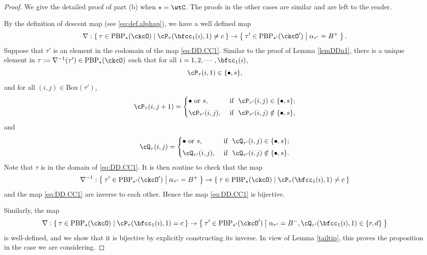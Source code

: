 \documentclass[12pt,a4paper]{amsart}
\def\DD{\nabla}
\numberwithin{equation}{section}
\theoremstyle{remark}
\def\ckcOp{\ckcO^{\prime}}
\def\BOX{\mathrm{Box}}
\def\PBP{\mathrm{PBP}}
\begin{document}
\begin{proof}
  We give the detailed proof of part (b) when $\star=\wtC$.
  The proofs in the other  cases are similar and are left to the reader.

By the definition of descent map (see \eqref{eq:def.alphap}), we have a well
defined map%
\begin{equation}\label{eq:DD.CC1}
\DD: \Set{\tau\in \PBP_{\star}(\ckcO)| \cP_\tau(\bfcc_{1}(\imath),1)\neq c}\rightarrow \Set{\tau'\in \PBP_{\star'}(\ckcOp)|  \alpha_{\tau'}=B^+}.
\end{equation}
Suppose that $\tau'$ is an element  in the codomain of the map \eqref{eq:DD.CC1}. Similar to the proof of Lemma \ref{lemDDn1}, there is a unique element in $\tau:=\nabla^{-1}(\tau')\in \PBP_{\star}(\ckcO)$ such that
for all $i=1,2, \cdots,\bfcc_{1}(\imath)$,
\[
  \cP_{\tau}(i,1)\in \{\bullet, s\},
\]
and
for all $(i,j)\in \BOX(\tau')$,
\[
     \cP_\tau(i,j+1)=\begin{cases}
    \bullet \textrm{ or } s,&\textrm{ if  $\ \cP_{\tau'}(i,j)\in \{\bullet, s\}$;} \smallskip \\
  \cP_{\tau'}(i,j),& \textrm{ if $\ \cP_{\tau'}(i,j)\notin \{\bullet, s\}$},\end{cases}
\]
 and
 \[
     \cQ_\tau(i,j)=\begin{cases}
    \bullet \textrm{ or } s,&\textrm{ if  $\ \cQ_{\tau'}(i,j)\in \{\bullet, s\}$;} \smallskip \\
  \cQ_{\tau'}(i,j), & \textrm{ if $\ \cQ_{\tau'}(i,j)\notin \{\bullet, s\}$}.  \end{cases}
\]
Note that $\tau$ is in the domain of \eqref{eq:DD.CC1}. It is then routine to check that the map
\[
  \nabla^{-1}: \Set{\tau'\in \PBP_{\star'}(\ckcOp)|  \alpha_{\tau'}=B^+}
  \rightarrow  \Set{\tau\in \PBP_{\star}(\ckcO)| \cP_\tau(\bfcc_{1}(\imath),1)\neq c}
\]
and the map \eqref{eq:DD.CC1} are inverse to each other. Hence the map \eqref{eq:DD.CC1} is bijective.

\smallskip

Similarly, the map
\[
  \nabla: \Set{\tau\in \PBP_{\star}(\ckcO)| \cP_\tau(\bfcc_{1}(\imath),1)= c}
  \rightarrow \Set{\tau'\in \PBP_{\star'}(\ckcOp)| \alpha_{\tau'}=B^-, \cQ_{\tau'}(\bfcc_{1}(\imath),1)\in\{r,d\}}
\]
is well-defined, and we show that it is bijective by explicitly  constructing its inverse. In view of Lemma \ref{tailtip}, this proves the proposition in the case we are considering.


\end{proof}
\end{document}
